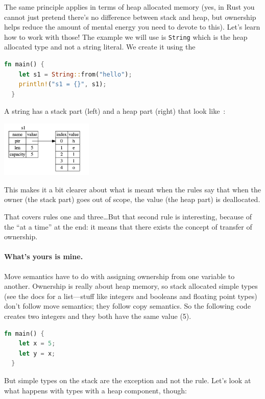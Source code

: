 The same principle applies in terms of heap allocated memory (yes, in Rust you cannot just pretend there's no difference between stack and heap, but ownership helps reduce the amount of mental energy you need to devote to this). Let's learn how to work with those! The example we will use is \texttt{String} which is the heap allocated type and not a string literal. We create it using the 
\begin{lstlisting}[language=Rust]
  fn main() {
    let s1 = String::from("hello");
    println!("s1 = {}", s1);
  }
\end{lstlisting}

A string has a stack part (left) and a heap part (right) that look like~\cite{rustdocs}:
\begin{center}
\includegraphics[width=0.33\textwidth]{images/string.png} 
\end{center}

This makes it a bit clearer about what is meant when the rules say that when the owner (the stack part) goes out of scope, the value (the heap part) is deallocated.

That covers rules one and three\ldots But that second rule is interesting, because of the ``at a time'' at the end: it means that there exists the concept of transfer of ownership. 

\paragraph{What's yours is mine.}
Move semantics have to do with assigning ownership from one variable to another. Ownership is really about heap memory, so stack allocated simple types (see the docs for a list---stuff like integers and booleans and floating point types) don't follow move semantics; they follow copy semantics. So the following code creates two integers and they both have the same value (5).

\begin{lstlisting}[language=Rust]
  fn main() {
   	let x = 5;
	let y = x;
  }
\end{lstlisting}

But simple types on the stack are the exception and not the rule. Let's look at what happens with types with a heap component, though:

